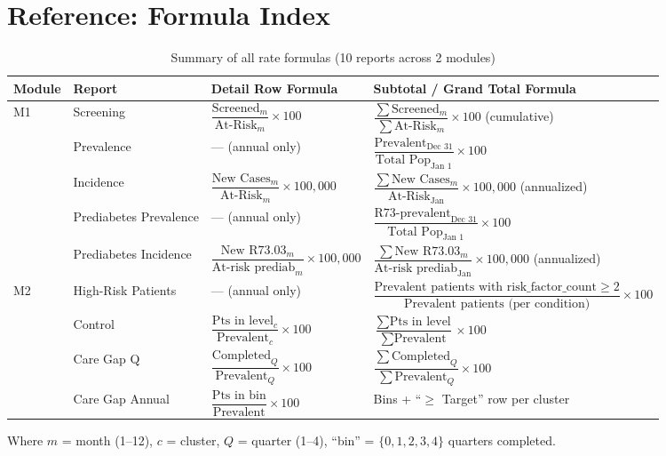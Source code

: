 \documentclass[11pt,a4paper]{article}
\begin{document}
\section{Reference: Formula Index}

\begin{table}[ht]
\centering\small
\caption{Summary of all rate formulas (10 reports across 2 modules)}
\begin{tabular}{@{}p{} p{} p{} p{}@{}}
\toprule
\textbf{Module} & \textbf{Report} & \textbf{Detail Row Formula} & \textbf{Subtotal / Grand Total Formula} \\
\midrule
\multirow{5}{*}{M1} &
Screening &
$\dfrac{\text{Screened}_m}{\text{At-Risk}_m} \times 100$ &
$\dfrac{\sum\text{Screened}_m}{\sum\text{At-Risk}_m} \times 100$ (cumulative) \\[14pt]
& Prevalence &
--- (annual only) &
$\dfrac{\text{Prevalent}_{\text{Dec 31}}}{\text{Total Pop}_{\text{Jan 1}}} \times 100$ \\[14pt]
& Incidence &
$\dfrac{\text{New Cases}_m}{\text{At-Risk}_m} \times 100{,}000$ &
$\dfrac{\sum\text{New Cases}_m}{\text{At-Risk}_{\text{Jan}}} \times 100{,}000$ (annualized) \\[10pt]
& Prediabetes Prevalence &
--- (annual only) &
$\dfrac{\text{R73-prevalent}_{\text{Dec 31}}}{\text{Total Pop}_{\text{Jan 1}}} \times 100$ \\[14pt]
& Prediabetes Incidence &
$\dfrac{\text{New R73.03}_m}{\text{At-risk prediab}_m} \times 100{,}000$ &
$\dfrac{\sum\text{New R73.03}_m}{\text{At-risk prediab}_{\text{Jan}}} \times 100{,}000$ (annualized) \\[10pt]
\midrule
\multirow{4}{*}{M2} &
High-Risk Patients &
--- (annual only) &
$\dfrac{\text{Prevalent patients with risk\_factor\_count} \geq 2}{\text{Prevalent patients (per condition)}} \times 100$ \\[14pt]
& Control &
$\dfrac{\text{Pts in level}_{c}}{\text{Prevalent}_{c}} \times 100$ &
$\dfrac{\sum\text{Pts in level}}{\sum\text{Prevalent}} \times 100$ \\[14pt]
& Care Gap Q &
$\dfrac{\text{Completed}_Q}{\text{Prevalent}_Q} \times 100$ &
$\dfrac{\sum\text{Completed}_Q}{\sum\text{Prevalent}_Q} \times 100$ \\[14pt]
& Care Gap Annual &
$\dfrac{\text{Pts in bin}}{\text{Prevalent}} \times 100$ &
Bins + ``$\geq$ Target'' row per cluster \\[4pt]
\bottomrule
\end{tabular}
\end{table}

Where $m$ = month (1--12), $c$ = cluster, $Q$ = quarter (1--4), ``bin'' = $\{0, 1, 2, 3, 4\}$ quarters completed.
\end{document}
